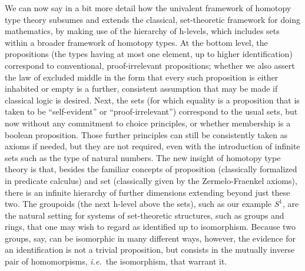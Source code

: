 \documentclass[11pt]{article}
\theoremstyle{remark}
\theoremstyle{definition}
\begin{document}
We can now say in a bit more detail how the univalent framework of homotopy type theory subsumes and extends the classical, set-theoretic
framework for doing mathematics, by making use of the hierarchy of h-levels, which includes sets within a broader
framework of homotopy types.  At the bottom level, the propositions (the types having at most one element, up to higher
identification) correspond to conventional, proof-irrelevant propositions; whether we also assert the law of excluded middle in the form that every such proposition is either inhabited or empty is a further, consistent assumption that may be made if classical logic is desired.  Next, the
sets (for which equality is a proposition that is taken to be ``self-evident'' or ``proof-irrelevant'')
correspond to the usual sets, but now without any commitment to choice principles, or whether membership is a boolean
proposition.  Those further principles can still be consistently taken as axioms if needed, but they are not required, even with the introduction of infinite sets such as the type of natural numbers.
The new insight of homotopy type theory is that, besides the familiar concepts of proposition (classically formalized in predicate
calculus) and set (classically given by the Zermelo-Fraenkel axioms), there is an infinite hierarchy of further
dimensions extending beyond just these two.  The groupoids (the next h-level above the sets), such as our example $S^1$, are the natural setting for systems of set-theoretic structures, such as groups and rings, that one may wish to regard as identified up to
isomorphism.  Because two groups, say, can be isomorphic in many different ways, however, the evidence for an
identification is not a trivial proposition, but consists in the mutually inverse pair of homomorpisms, \textit{i.e.}\ the
isomorphism, that warrant it.
\end{document}

